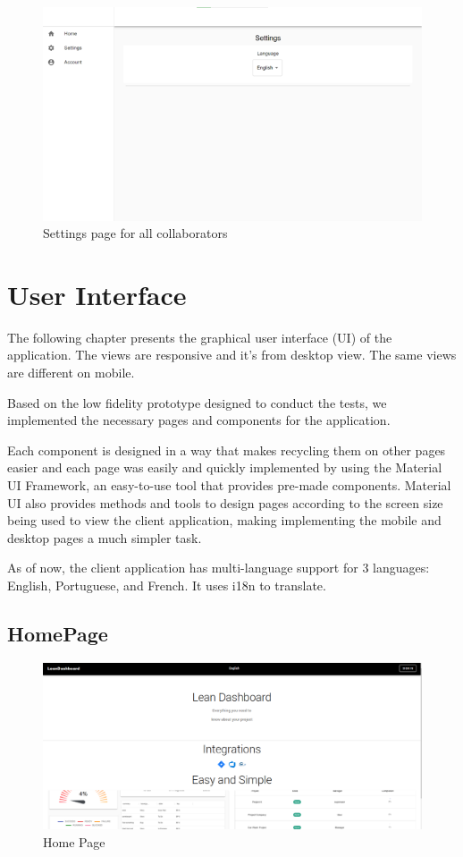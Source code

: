 \documentclass[a4paper,twoside,10pt]{report}
\begin{document}
\begin{figure}[h!]
\center
  \includegraphics[width=\textwidth]{settingsPageForCollaborators.png}
\caption{Settings page for all collaborators}
\end{figure}



\chapter{User Interface}
The following chapter presents the graphical user interface (UI) of the application. The views are responsive and it's from desktop view. The same views are different on mobile.

Based on the low fidelity prototype designed to conduct the tests, we implemented the necessary pages and components for the application.

Each component is designed in a way that makes recycling them on other pages easier and each page was easily and quickly implemented by using the Material UI Framework, an easy-to-use tool that provides pre-made components.
Material UI also provides methods and tools to design pages according to the screen size being used to view the client application, making implementing the mobile and desktop pages a much simpler task.

As of now, the client application has multi-language support for 3 languages: English, Portuguese, and French. It uses i18n to translate.
 \section{HomePage}
\begin{figure}[h!]
\center
  \includegraphics[width=\textwidth]{HomePage.png}
\caption{Home Page}
\end{figure}
\end{document}

